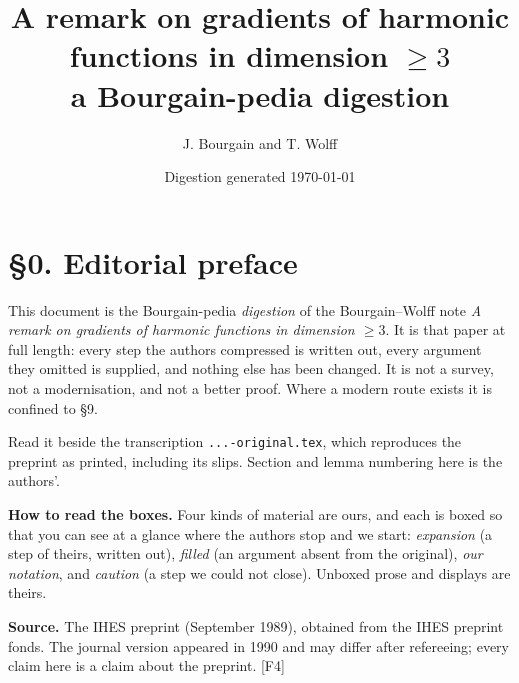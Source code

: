 \documentclass[11pt,reqno]{amsart}
\theoremstyle{plain}
\theoremstyle{definition}
\theoremstyle{plain}
\theoremstyle{definition}
\theoremstyle{remark}
\newcommand{\Ledger}[1]{{\scriptsize\textsf{[#1]}}}
\begin{document}
\title[Gradients of harmonic functions in dimension $\ge3$ --- digestion]
      {A remark on gradients of harmonic functions in dimension $\geq 3$\\
       \normalsize a Bourgain-pedia digestion}
\author{J. Bourgain and T. Wolff}
\address{Original: IHES/M/89/31, September 1989; Colloq.\ Math.\ 60/61 (1990), 253--260}
\date{Digestion generated \today}
\maketitle

\section*{\S0. Editorial preface}

This document is the Bourgain-pedia \emph{digestion} of the Bourgain--Wolff note
\emph{A remark on gradients of harmonic functions in dimension $\ge3$}. It is that
paper at full length: every step the authors compressed is written out, every
argument they omitted is supplied, and nothing else has been changed. It is not a
survey, not a modernisation, and not a better proof. Where a modern route exists it
is confined to \S9.

Read it beside the transcription
\texttt{...-original.tex}, which reproduces the preprint as printed, including its
slips. Section and lemma numbering here is the authors'.

\medskip
\noindent\textbf{How to read the boxes.} Four kinds of material are ours, and each
is boxed so that you can see at a glance where the authors stop and we start:
\emph{expansion} (a step of theirs, written out), \emph{filled} (an argument absent
from the original), \emph{our notation}, and \emph{caution} (a step we could not
close). Unboxed prose and displays are theirs.

\medskip
\noindent\textbf{Source.} The IHES preprint (September 1989), obtained from the IHES
preprint fonds. The journal version appeared in 1990 and may differ after
refereeing; every claim here is a claim about the preprint. \Ledger{F4}
\end{document}
